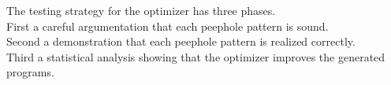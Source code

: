\begin{slide*}
The testing strategy for the optimizer has three phases.\\

First a careful argumentation that each peephole pattern is sound.\\

Second a demonstration that each peephole pattern is realized correctly.\\

Third a statistical analysis showing that the optimizer improves the generated
programs.
\vfil
\end{slide*}
 
\begin{slide*}
\vfil
\end{slide*}
 
\begin{slide*}
\vfil
\end{slide*}
 
\begin{slide*}
\vfil
\end{slide*}
 
\begin{slide*}
\vfil
\end{slide*}
 
\begin{slide*}
\vfil
\end{slide*}
 


